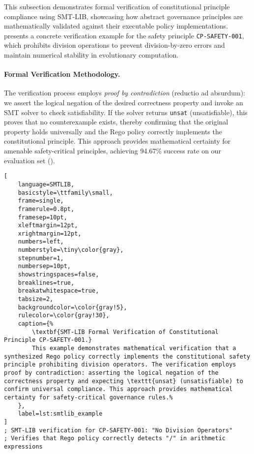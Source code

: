 \documentclass[manuscript,screen,9pt]{acmart}
\begin{document}
\begin{table}[!htb]
This subsection demonstrates formal verification of constitutional principle compliance using SMT-LIB, showcasing how abstract governance principles are mathematically validated against their executable policy implementations.  presents a concrete verification example for the safety principle \texttt{CP-SAFETY-001}, which prohibits division operations to prevent division-by-zero errors and maintain numerical stability in evolutionary computation.

\paragraph{Formal Verification Methodology.} The verification process employs \textit{proof by contradiction} (reductio ad absurdum): we assert the logical negation of the desired correctness property and invoke an SMT solver to check satisfiability. If the solver returns \texttt{unsat} (unsatisfiable), this proves that no counterexample exists, thereby confirming that the original property holds universally and the Rego policy correctly implements the constitutional principle. This approach provides mathematical certainty for amenable safety-critical principles, achieving 94.67\% success rate on our evaluation set ().

\begin{lstlisting}[
    language=SMTLIB,
    basicstyle=\ttfamily\small,
    frame=single,
    framerule=0.8pt,
    framesep=10pt,
    xleftmargin=12pt,
    xrightmargin=12pt,
    numbers=left,
    numberstyle=\tiny\color{gray},
    stepnumber=1,
    numbersep=10pt,
    showstringspaces=false,
    breaklines=true,
    breakatwhitespace=true,
    tabsize=2,
    backgroundcolor=\color{gray!5},
    rulecolor=\color{gray!30},
    caption={%
        \textbf{SMT-LIB Formal Verification of Constitutional Principle CP-SAFETY-001.}
        This example demonstrates mathematical verification that a synthesized Rego policy correctly implements the constitutional safety principle prohibiting division operators. The verification employs proof by contradiction: asserting the logical negation of the correctness property and expecting \texttt{unsat} (unsatisfiable) to confirm universal compliance. This approach provides mathematical certainty for safety-critical governance rules.%
    },
    label=lst:smtlib_example
]
; SMT-LIB verification for CP-SAFETY-001: "No Division Operators"
; Verifies that Rego policy correctly detects "/" in arithmetic expressions


\end{lstlisting}
\end{table}
\end{document}
